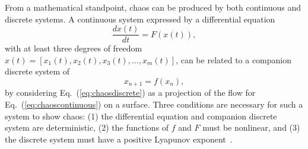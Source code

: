 \documentclass[acmtaco]{acmtrans2m}
\newcommand{\equationname}{Eq.}
\begin{document}
From a mathematical standpoint, chaos can be produced by both continuous
and discrete systems.  A continuous system expressed by a differential
equation
\begin{equation}
  \label{eq:chaoscontinuous}
  \dfrac{dx(t)}{dt} = F(x(t)),
\end{equation}
with at least three degrees of freedom
$x(t)=[x_{1}(t),x_{2}(t),x_{3}(t),\ldots, x_{m}(t)]$,
can be related to a companion discrete system of
\begin{equation}
  \label{eq:chaosdiscrete}
  x_{n+1}=f(x_{n}),
\end{equation}
by considering \equationname~(\ref{eq:chaosdiscrete}) as a projection of
the flow for \equationname~(\ref{eq:chaoscontinuous}) on a surface.
Three conditions are necessary for such a system to show chaos: (1) the
differential equation and companion discrete system are
deterministic, (2) the functions of $f$ and $F$ must be nonlinear, and (3) the
discrete system must have a positive Lyapunov exponent~\cite{Liu2010}.
\end{document}
